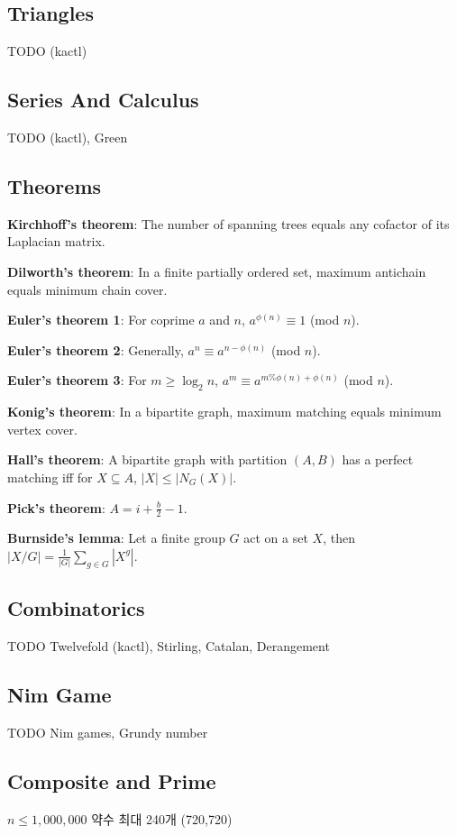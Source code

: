 \subsection{Triangles}
TODO (kactl)

\subsection{Series And Calculus}
TODO (kactl), Green

\subsection{Theorems}

\textbf{Kirchhoff's theorem}: The number of spanning trees equals any cofactor of its Laplacian matrix.

\textbf{Dilworth's theorem}: In a finite partially ordered set, maximum antichain equals minimum chain cover.

\textbf{Euler's theorem 1}: For coprime $a$ and $n$, $a^{\phi(n)} \equiv 1$ (mod $n$).

\textbf{Euler's theorem 2}: Generally, $a^n \equiv a^{n-\phi(n)}$ (mod $n$).

\textbf{Euler's theorem 3}: For $m \geq \log_2 n$, $a^m \equiv a^{m\%\phi(n) + \phi(n)}$ (mod $n$).

\textbf{Konig's theorem}: In a bipartite graph, maximum matching equals minimum vertex cover.

\textbf{Hall's theorem}: A bipartite graph with partition $(A,B)$ has a perfect matching iff for $X \subseteq A$, $|X| \leq |N_G(X)|$.

\textbf{Pick's theorem}: $A = i+\frac{b}{2}-1$.

\textbf{Burnside's lemma}: Let a finite group $G$ act on a set $X$, then $|X/G| = \frac{1}{|G|}\sum_{g \in G}|X^g|$.

\subsection{Combinatorics}
TODO Twelvefold (kactl), Stirling, Catalan, Derangement

\subsection{Nim Game}
TODO Nim games, Grundy number

\subsection{Composite and Prime}
$n \leq 1,000,000$ 약수 최대 240개 (720,720)

